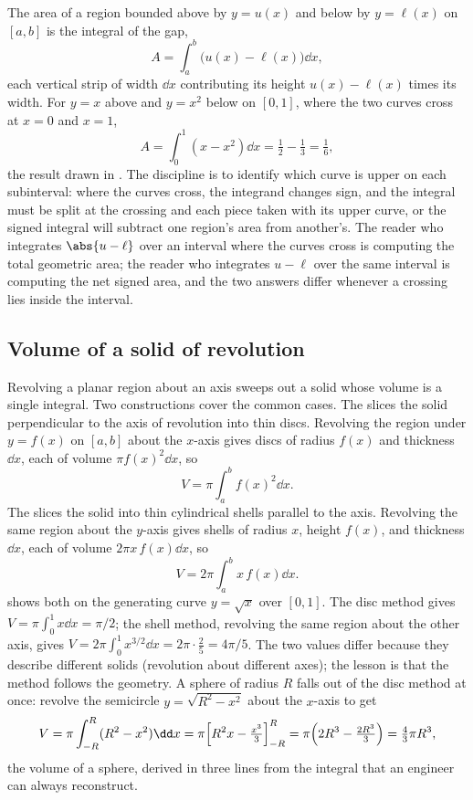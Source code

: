 The area of a region bounded above by $y = u(x)$ and below by $y =
\ell(x)$ on $[a, b]$ is the integral of the gap,
\[
A = \int_{a}^{b}\bigl(u(x) - \ell(x)\bigr)\dd x,
\]
each vertical strip of width $\dd x$ contributing its height
$u(x) - \ell(x)$ times its width. For $y = x$ above and $y = x^{2}$
below on $[0, 1]$, where the two curves cross at $x = 0$ and $x =
1$,
\[
A = \int_{0}^{1}(x - x^{2})\dd x = \tfrac{1}{2} - \tfrac{1}{3} =
\tfrac{1}{6},
\]
the result drawn in . The
discipline is to identify which curve is upper on each subinterval:
where the curves cross, the integrand changes sign, and the integral
must be split at the crossing and each piece taken with its upper
curve, or the signed integral will subtract one region's area from
another's. The reader who integrates $\abs{u - \ell}$ over an
interval where the curves cross is computing the total geometric
area; the reader who integrates $u - \ell$ over the same interval is
computing the net signed area, and the two answers differ whenever a
crossing lies inside the interval.



\subsection{Volume of a solid of revolution}

Revolving a planar region about an axis sweeps out a solid whose
volume is a single integral. Two constructions cover the common
cases. The  slices the solid perpendicular to
the axis of revolution into thin discs. Revolving the region under
$y = f(x)$ on $[a, b]$ about the $x$-axis gives discs of radius
$f(x)$ and thickness $\dd x$, each of volume $\pi f(x)^{2}\dd x$, so
\[
V = \pi\int_{a}^{b} f(x)^{2}\dd x.
\]
The  slices the solid into thin cylindrical
shells parallel to the axis. Revolving the same region about the
$y$-axis gives shells of radius $x$, height $f(x)$, and thickness
$\dd x$, each of volume $2\pi x\,f(x)\dd x$, so
\[
V = 2\pi\int_{a}^{b} x\,f(x)\dd x.
\]
 shows both on the generating curve
$y = \sqrt{x}$ over $[0, 1]$. The disc method gives $V = \pi
\int_{0}^{1} x\dd x = \pi/2$; the shell method, revolving the same
region about the other axis, gives $V = 2\pi\int_{0}^{1} x^{3/2}\dd
x = 2\pi\cdot\tfrac{2}{5} = 4\pi/5$. The two values differ because
they describe different solids (revolution about different axes);
the lesson is that the method follows the geometry. A sphere of
radius $R$ falls out of the disc method at once: revolve the
semicircle $y = \sqrt{R^{2} - x^{2}}$ about the $x$-axis to get
\[
V = \pi\int_{-R}^{R}(R^{2} - x^{2})\dd x = \pi\Bigl[R^{2}x -
\tfrac{x^{3}}{3}\Bigr]_{-R}^{R} = \pi\Bigl(2R^{3} -
\tfrac{2R^{3}}{3}\Bigr) = \tfrac{4}{3}\pi R^{3},
\]
the volume of a sphere, derived in three lines from the integral
that an engineer can always reconstruct.

